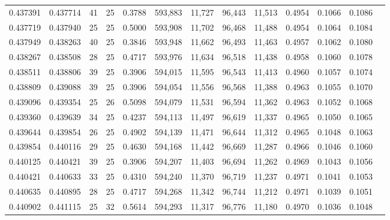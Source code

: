 \begin{tabular}{rrrrrrrrrrrrr}
0.437391 & 0.437714 &    41 &  25 &                                     0.3788 & 593,883 &  11,727 &  96,443 &  11,513 & 0.4954 & 0.1066 & 0.1086 \\
0.437719 & 0.437940 &    25 &  25 &                                     0.5000 & 593,908 &  11,702 &  96,468 &  11,488 & 0.4954 & 0.1064 & 0.1084 \\
0.437949 & 0.438263 &    40 &  25 &                                     0.3846 & 593,948 &  11,662 &  96,493 &  11,463 & 0.4957 & 0.1062 & 0.1080 \\
0.438267 & 0.438508 &    28 &  25 &                                     0.4717 & 593,976 &  11,634 &  96,518 &  11,438 & 0.4958 & 0.1060 & 0.1078 \\
0.438511 & 0.438806 &    39 &  25 &                                     0.3906 & 594,015 &  11,595 &  96,543 &  11,413 & 0.4960 & 0.1057 & 0.1074 \\
0.438809 & 0.439088 &    39 &  25 &                                     0.3906 & 594,054 &  11,556 &  96,568 &  11,388 & 0.4963 & 0.1055 & 0.1070 \\
0.439096 & 0.439354 &    25 &  26 &                                     0.5098 & 594,079 &  11,531 &  96,594 &  11,362 & 0.4963 & 0.1052 & 0.1068 \\
0.439360 & 0.439639 &    34 &  25 &                                     0.4237 & 594,113 &  11,497 &  96,619 &  11,337 & 0.4965 & 0.1050 & 0.1065 \\
0.439644 & 0.439854 &    26 &  25 &                                     0.4902 & 594,139 &  11,471 &  96,644 &  11,312 & 0.4965 & 0.1048 & 0.1063 \\
0.439854 & 0.440116 &    29 &  25 &                                     0.4630 & 594,168 &  11,442 &  96,669 &  11,287 & 0.4966 & 0.1046 & 0.1060 \\
0.440125 & 0.440421 &    39 &  25 &                                     0.3906 & 594,207 &  11,403 &  96,694 &  11,262 & 0.4969 & 0.1043 & 0.1056 \\
0.440421 & 0.440633 &    33 &  25 &                                     0.4310 & 594,240 &  11,370 &  96,719 &  11,237 & 0.4971 & 0.1041 & 0.1053 \\
0.440635 & 0.440895 &    28 &  25 &                                     0.4717 & 594,268 &  11,342 &  96,744 &  11,212 & 0.4971 & 0.1039 & 0.1051 \\
0.440902 & 0.441115 &    25 &  32 &                                     0.5614 & 594,293 &  11,317 &  96,776 &  11,180 & 0.4970 & 0.1036 & 0.1048 \\

\end{tabular}
